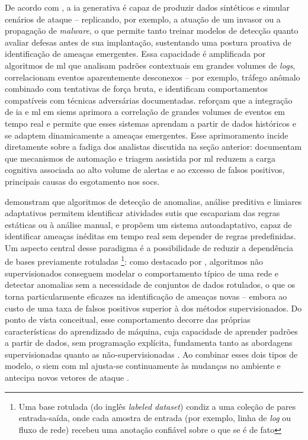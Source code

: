 De acordo com , a \gls{ia} generativa é capaz de produzir dados sintéticos e simular cenários de ataque -- replicando, por exemplo, a atuação de um invasor ou a propagação de \textit{malware}, o que permite tanto treinar modelos de detecção quanto avaliar defesas antes de sua implantação, sustentando uma postura proativa de identificação de ameaças emergentes. 
Essa capacidade é amplificada por algoritmos de \gls{ml} que analisam padrões contextuais em grandes volumes de \textit{logs}, correlacionam eventos aparentemente desconexos -- por exemplo, tráfego anômalo combinado com tentativas de força bruta, e identificam comportamentos compatíveis com técnicas adversárias documentadas. 
 reforçam que a integração de \gls{ia} e \gls{ml} em \gls{siem}s aprimora a correlação de grandes volumes de eventos em tempo real e permite que esses sistemas aprendam a partir de dados históricos e se adaptem dinamicamente a ameaças emergentes. 
Esse aprimoramento incide diretamente sobre a fadiga dos analistas discutida na seção anterior:  documentam que mecanismos de automação e triagem assistida por \gls{ml} reduzem a carga cognitiva associada ao alto volume de alertas e ao excesso de falsos positivos, principais causas do esgotamento nos \gls{soc}s.

 demonstram que algoritmos de detecção de anomalias, análise preditiva e limiares adaptativos permitem identificar atividades sutis que escapariam das regras estáticas ou à análise manual, e propõem um sistema autoadaptativo, capaz de identificar ameaças inéditas em tempo real sem depender de regras predefinidas. 
Um aspecto central desse paradigma é a possibilidade de reduzir a dependência de bases previamente rotuladas
\footnote{Uma base rotulada (do inglês \textit{labeled dataset}) condiz a uma coleção de pares entrada-saída, onde cada amostra de entrada (por exemplo, linha de \textit{log} ou fluxo de rede) recebeu uma anotação confiável sobre o que se é de fato}: 
como destacado por , algoritmos não supervisionados conseguem modelar o comportamento típico de uma rede e detectar anomalias sem a necessidade de conjuntos de dados rotulados, o que os torna particularmente eficazes na identificação de ameaças novas -- embora ao custo de uma taxa de falsos positivos superior à dos métodos supervisionados. 
Do ponto de vista conceitual, esse comportamento decorre das próprias características do aprendizado de máquina, cuja capacidade de aprender padrões a partir de dados, sem programação explícita, fundamenta tanto as abordagens supervisionadas quanto as não-supervisionadas \cite{jordan2015machine}. 
Ao combinar esses dois tipos de modelo, o \gls{siem} com \gls{ml} ajusta-se continuamente às mudanças no ambiente e antecipa novos vetores de ataque \cite{sheeraz2024siem}.

